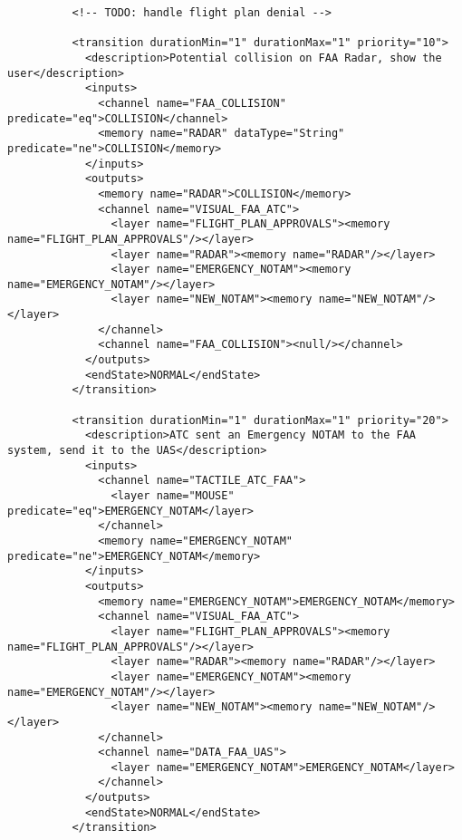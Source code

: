 \begin{verbatim}
          <!-- TODO: handle flight plan denial -->
          
          <transition durationMin="1" durationMax="1" priority="10">
            <description>Potential collision on FAA Radar, show the user</description>
            <inputs>
              <channel name="FAA_COLLISION" predicate="eq">COLLISION</channel>
              <memory name="RADAR" dataType="String" predicate="ne">COLLISION</memory>
            </inputs>
            <outputs>
              <memory name="RADAR">COLLISION</memory>
              <channel name="VISUAL_FAA_ATC">
                <layer name="FLIGHT_PLAN_APPROVALS"><memory name="FLIGHT_PLAN_APPROVALS"/></layer>
                <layer name="RADAR"><memory name="RADAR"/></layer>
                <layer name="EMERGENCY_NOTAM"><memory name="EMERGENCY_NOTAM"/></layer>
                <layer name="NEW_NOTAM"><memory name="NEW_NOTAM"/></layer>
              </channel>
              <channel name="FAA_COLLISION"><null/></channel>
            </outputs>
            <endState>NORMAL</endState>
          </transition>
          
          <transition durationMin="1" durationMax="1" priority="20">
            <description>ATC sent an Emergency NOTAM to the FAA system, send it to the UAS</description>
            <inputs>
              <channel name="TACTILE_ATC_FAA">
                <layer name="MOUSE" predicate="eq">EMERGENCY_NOTAM</layer>
              </channel>
              <memory name="EMERGENCY_NOTAM" predicate="ne">EMERGENCY_NOTAM</memory>
            </inputs>
            <outputs>
              <memory name="EMERGENCY_NOTAM">EMERGENCY_NOTAM</memory>
              <channel name="VISUAL_FAA_ATC">
                <layer name="FLIGHT_PLAN_APPROVALS"><memory name="FLIGHT_PLAN_APPROVALS"/></layer>
                <layer name="RADAR"><memory name="RADAR"/></layer>
                <layer name="EMERGENCY_NOTAM"><memory name="EMERGENCY_NOTAM"/></layer>
                <layer name="NEW_NOTAM"><memory name="NEW_NOTAM"/></layer>
              </channel>
              <channel name="DATA_FAA_UAS">
                <layer name="EMERGENCY_NOTAM">EMERGENCY_NOTAM</layer>
              </channel>
            </outputs>
            <endState>NORMAL</endState>
          </transition>
          

\end{verbatim}
